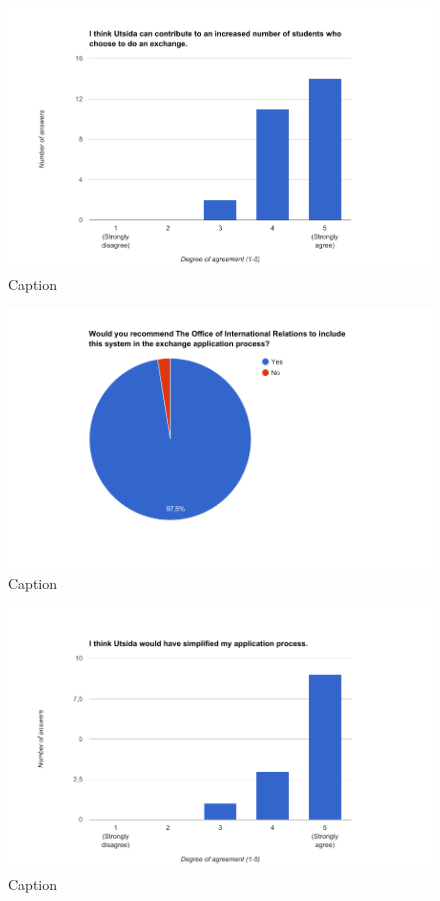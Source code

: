 \begin{figure}[h]
    \centering
    \includegraphics[width=1\textwidth]{fig/questionnaire2_diagrams/3.png}
    \caption[]{Caption}
    \label{fig:my_label}
\end{figure}

\begin{figure}[h]
    \centering
    \includegraphics[width=1\textwidth]{fig/questionnaire2_diagrams/4.png}
    \caption[]{Caption}
    \label{fig:my_label}
\end{figure}

\begin{figure}[h]
    \centering
    \includegraphics[width=1\textwidth]{fig/questionnaire2_diagrams/5.png}
    \caption[]{Caption}
    \label{fig:my_label}
\end{figure}

